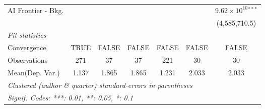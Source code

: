 \begin{tabular}{lcccccc}
   AI Frontier - Bkg.      &        &         &                  &               &         & $9.62\times 10^{10}$$^{***}$\\    
                           &        &         &                  &               &         & (4,585,710.5)\\   
   \midrule
   \emph{Fit statistics}\\
   Convergence             &TRUE    & FALSE   & FALSE            & FALSE         & FALSE   & FALSE\\  
   Observations            & 271    & 37      & 37               & 221           & 30      & 30\\  
Mean(Dep. Var.) & 1.137 & 1.865 & 1.865 & 1.231 & 2.033 & 2.033 \\
   \midrule \midrule
   \multicolumn{7}{l}{\emph{Clustered (author \& quarter) standard-errors in parentheses}}\\
   \multicolumn{7}{l}{\emph{Signif. Codes: ***: 0.01, **: 0.05, *: 0.1}}\\
\end{tabular}
\par\endgroup
